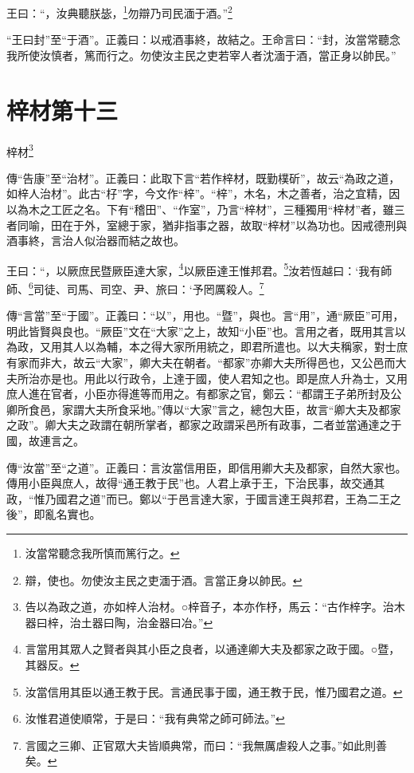 王曰：“，汝典聽朕毖，\footnote{汝當常聽念我所慎而篤行之。}勿辯乃司民湎于酒。”\footnote{辯，使也。勿使汝主民之吏湎于酒。言當正身以帥民。}

{\noindent\shu{}\fzkt “王曰封”至“于酒”。正義曰：以戒酒事終，故結之。王命言曰：“封，汝當常聽念我所使汝慎者，篤而行之。勿使汝主民之吏若宰人者沈湎于酒，當正身以帥民。” \par}

\section{梓材第十三}


梓材\footnote{告以為政之道，亦如梓人治材。○梓音子，本亦作杼，馬云：“古作梓字。治木器曰梓，治土器曰陶，治金器曰冶。”}

{\noindent\shu{}\fzkt 傳“告康”至“治材”。正義曰：此取下言“若作梓材，既勤樸斫”，故云“為政之道，如梓人治材”。此古“杍”字，今文作“梓”。“梓”，木名，木之善者，治之宜精，因以為木之工匠之名。下有“稽田”、“作室”，乃言“梓材”，三種獨用“梓材”者，雖三者同喻，田在于外，室總于家，猶非指事之器，故取“梓材”以為功也。因戒德刑與酒事終，言治人似治器而結之故也。 \par}

王曰：“，以厥庶民暨厥臣達大家，\footnote{言當用其眾人之賢者與其小臣之良者，以通達卿大夫及都家之政于國。○暨，其器反。}以厥臣達王惟邦君。\footnote{汝當信用其臣以通王教于民。言通民事于國，通王教于民，惟乃國君之道。}汝若恆越曰：‘我有師師、\footnote{汝惟君道使順常，于是曰：“我有典常之師可師法。”}司徒、司馬、司空、尹、旅曰：‘予罔厲殺人。\footnote{言國之三卿、正官眾大夫皆順典常，而曰：“我無厲虐殺人之事。”如此則善矣。}


{\noindent\zhuan{}\fzbyks 傳“言當”至“于國”。正義曰：“以”，用也。“暨”，與也。言“用”，通“厥臣”可用，明此皆賢與良也。“厥臣”文在“大家”之上，故知“小臣”也。言用之者，既用其言以為政，又用其人以為輔，本之得大家所用統之，即君所遣也。以大夫稱家，對士庶有家而非大，故云“大家”，卿大夫在朝者。“都家”亦卿大夫所得邑也，又公邑而大夫所治亦是也。用此以行政令，上達于國，使人君知之也。即是庶人升為士，又用庶人進在官者，小臣亦得進等而用之。有都家之官，鄭云：“都謂王子弟所封及公卿所食邑，家謂大夫所食采地。”傳以“大家”言之，總包大臣，故言“卿大夫及都家之政”。卿大夫之政謂在朝所掌者，都家之政謂采邑所有政事，二者並當通達之于國，故連言之。 \par}

{\noindent\zhuan{}\fzbyks 傳“汝當”至“之道”。正義曰：言汝當信用臣，即信用卿大夫及都家，自然大家也。傳用小臣與庶人，故得“通王教于民”也。人君上承于王，下治民事，故交通其政，“惟乃國君之道”而已。鄭以“于邑言達大家，于國言達王與邦君，王為二王之後”，即亂名實也。 \par}

